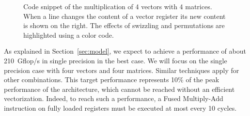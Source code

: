 \documentclass{sig-alternate}
\begin{document}
\begin{figure}
  \centering
{}%

\caption{Code snippet of the multiplication of 4 vectors with 4
  matrices. When a line changes the content of a vector register its
  new content is shown on the right. The effects of swizzling and
  permutations are highlighted using a color code.}
\label{code:mat_mul}
\end{figure}



As explained in Section~\ref{sec:model}, we expect to achieve a performance of
about 210~Gflop/s in single precision in the best case. We will focus
on the single precision case with four vectors and four matrices. 
Similar techniques apply for other combinations. This target
performance represents 10\% of the peak performance of the
architecture, which cannot be reached without an efficient vectorization. 
Indeed, to reach such a performance, a Fused Multiply-Add
instruction on fully loaded registers must be executed at most every
10 cycles.
\end{document}
